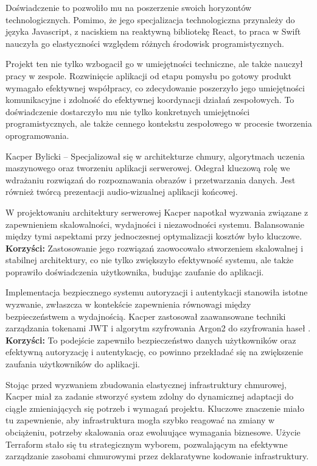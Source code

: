 \documentclass[12pt, a4paper, twoside, openany]{book}
\begin{document}
{Doświadczenie to pozwoliło mu na poszerzenie swoich horyzontów technologicznych. Pomimo, że jego specjalizacja technologiczna przynależy do języka Javascript, z naciskiem na reaktywną bibliotekę React, to praca w Swift nauczyła go elastyczności względem różnych środowisk programistycznych.

Projekt ten nie tylko wzbogacił go w umiejętności techniczne, ale także nauczył pracy w zespole. Rozwinięcie aplikacji od etapu pomysłu po gotowy produkt wymagało efektywnej współpracy, co zdecydowanie poszerzyło jego umiejętności komunikacyjne i zdolność do efektywnej koordynacji działań zespołowych. To doświadczenie dostarczyło mu nie tylko konkretnych umiejętności programistycznych, ale także cennego kontekstu zespołowego w procesie tworzenia oprogramowania.

Kacper Bylicki -- Specjalizował się w architekturze chmury, algorytmach uczenia maszynowego oraz tworzeniu aplikacji serwerowej. Odegrał kluczową rolę we wdrażaniu rozwiązań do rozpoznawania obrazów i przetwarzania danych. Jest również twórcą prezentacji audio-wizualnej aplikacji końcowej.

W projektowaniu architektury serwerowej Kacper napotkał wyzwania związane z zapewnieniem skalowalności, wydajności i niezawodności systemu. Balansowanie między tymi aspektami przy jednoczesnej optymalizacji kosztów było kluczowe. \textbf{Korzyści:} Zastosowanie jego rozwiązań zaowocowało stworzeniem skalowalnej i stabilnej architektury, co nie tylko zwiększyło efektywność systemu, ale także poprawiło doświadczenia użytkownika, budując zaufanie do aplikacji.

Implementacja bezpiecznego systemu autoryzacji i autentykacji stanowiła istotne wyzwanie, zwłaszcza w kontekście zapewnienia równowagi między bezpieczeństwem a wydajnością. Kacper zastosował zaawansowane techniki zarządzania tokenami JWT i algorytm szyfrowania Argon2 do szyfrowania haseł . 
\textbf{Korzyści:} To podejście zapewniło bezpieczeństwo danych użytkowników oraz efektywną autoryzację i autentykację, co powinno przekładać się na zwiększenie zaufania użytkowników do aplikacji.

Stojąc przed wyzwaniem zbudowania elastycznej infrastruktury chmurowej, Kacper miał za zadanie stworzyć system zdolny do dynamicznej adaptacji do ciągle zmieniających się potrzeb i wymagań projektu. Kluczowe znaczenie miało tu zapewnienie, aby infrastruktura mogła szybko reagować na zmiany w obciążeniu, potrzeby skalowania oraz ewoluujące wymagania biznesowe. Użycie Terraform stało się tu strategicznym wyborem, pozwalającym na efektywne zarządzanie zasobami chmurowymi przez deklaratywne kodowanie infrastruktury.

}
\end{document}
